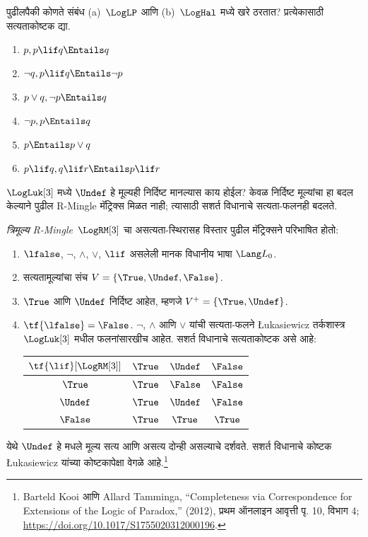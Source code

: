 \begin{prob}
  पुढीलपैकी कोणते संबंध (a)~$\LogLP$ आणि (b)~$\LogHal$
  मध्ये खरे ठरतात? प्रत्येकासाठी सत्यताकोष्टक द्या.
  \begin{enumerate}
    \item $p, p \lif q \Entails q$
    \item $\lnot q, p \lif q \Entails \lnot p$
    \item $p \lor q, \lnot p \Entails q$
    \item $\lnot p, p \Entails q$
    \item $p \Entails p \lor q$
    \item $p \lif q, q\lif r \Entails p \lif r$
  \end{enumerate}
\end{prob}

$\LogLuk[3]$ मध्ये $\Undef$ हे मूल्यही निर्दिष्ट मानल्यास
काय होईल?
केवळ निर्दिष्ट मूल्यांचा हा बदल केल्याने पुढील R-Mingle
मॅट्रिक्स मिळत नाही; त्यासाठी सशर्त विधानाचे सत्यता-फलनही बदलते.

\begin{defn}
  \emph{त्रिमूल्य R-Mingle}~$\LogRM[3]$ चा असत्यता-स्थिरासह
  विस्तार पुढील मॅट्रिक्सने परिभाषित होतो:
  \begin{enumerate}
    \item $\lfalse$, $\lnot$, $\land$, $\lor$, $\lif$ असलेली मानक विधानीय भाषा $\Lang L_0$.
    \item सत्यतामूल्यांचा संच $V = \{\True, \Undef, \False\}$.
    \item $\True$ आणि $\Undef$ निर्दिष्ट आहेत, म्हणजे $V^+ = \{\True, \Undef\}$.
    \item $\tf{\lfalse}=\False$. $\lnot$, $\land$ आणि $\lor$
    यांची सत्यता-फलने \L ukasiewicz तर्कशास्त्र~$\LogLuk[3]$
    मधील फलनांसारखीच आहेत. सशर्त विधानाचे सत्यताकोष्टक असे आहे:
    \begin{center}
      \begin{tabular}{c|ccc}
        $\tf{\lif}[\LogRM[3]]$ & $\True$ & $\Undef$ & $\False$ \\
        \hline
        $\True$ & $\True$ & $\False$ & $\False$ \\
        $\Undef$ & $\True$ & $\Undef$ & $\False$ \\
        $\False$ & $\True$ & $\True$ & $\True$
      \end{tabular}
    \end{center}
  \end{enumerate}
  येथे $\Undef$ हे मधले मूल्य सत्य आणि असत्य दोन्ही असल्याचे
  दर्शवते. सशर्त विधानाचे कोष्टक \L ukasiewicz यांच्या कोष्टकापेक्षा
  वेगळे आहे.\footnote{Barteld Kooi आणि Allard Tamminga,
  ``Completeness via Correspondence for Extensions of the Logic of
  Paradox,'' (2012), प्रथम ऑनलाइन आवृत्ती पृ. 10, विभाग 4;
  \url{https://doi.org/10.1017/S1755020312000196}.}
\end{defn}

